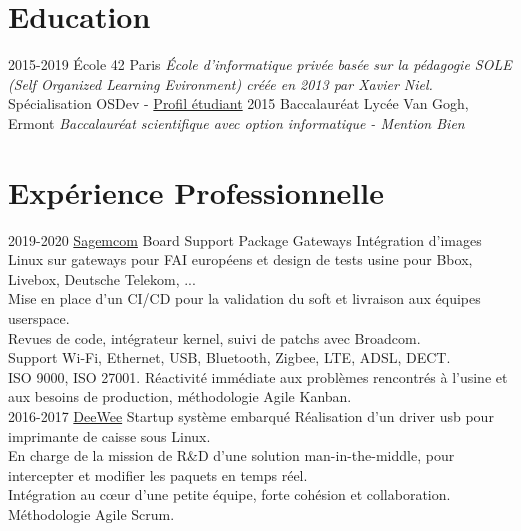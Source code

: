 \documentclass[]{twentysecondcv}
\begin{document}
\section{Education}

\begin{twenty}
  \twentyitem
    {2015-2019}
    {École 42}
    {Paris}
    {
		\emph{École d'informatique privée basée sur la pédagogie SOLE (Self Organized Learning Evironment) créée en 2013 par Xavier Niel.} \\
		Spécialisation OSDev - \href{https://cv.42.fr/tvermeil}{\textcolor{cerulean}{Profil étudiant}}
	}
  \twentyitem
    {2015}
    {Baccalauréat}
    {Lycée Van Gogh, Ermont}
    {\emph{Baccalauréat scientifique avec option informatique - Mention Bien}}
\end{twenty}


\section{Expérience Professionnelle}

\begin{twentyshort}
	\twentyitem
    {2019-2020}
    {\href{https://www.sagemcom.com/broadband-solutions/}{\textcolor{cerulean}{Sagemcom}}}
    {Board Support Package Gateways}
    {
		Intégration d'images Linux sur gateways pour FAI européens et design de tests usine pour Bbox, Livebox, Deutsche Telekom, ... \\
		Mise en place d'un CI/CD pour la validation du soft et livraison aux équipes userspace. \\
		Revues de code, intégrateur kernel, suivi de patchs avec Broadcom. \\
		Support Wi-Fi, Ethernet, USB, Bluetooth, Zigbee, LTE, ADSL, DECT. \\
		ISO 9000, ISO 27001. Réactivité immédiate aux problèmes rencontrés à l'usine et aux besoins de production, méthodologie Agile Kanban. \\
	}
  \twentyitem
    {2016-2017}
    {\href{https://www.deewee.net/fr/}{\textcolor{cerulean}{DeeWee}}}
    {Startup système embarqué}
    {
		Réalisation d'un driver usb pour imprimante de caisse sous Linux. \\
		En charge de la mission de R\&D d'une solution man-in-the-middle,
		pour intercepter et modifier les paquets en temps réel. \\
		Intégration au cœur d'une petite équipe, forte cohésion et collaboration. \\
		Méthodologie Agile Scrum.
	}
\end{twentyshort}
\end{document}
